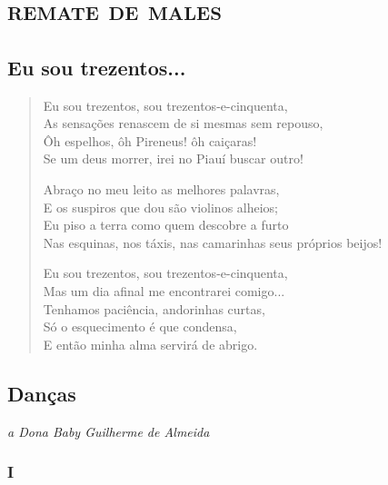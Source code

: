 \part{\textsc{remate de males}}
\removeepigraph


\chapter[Eu sou trezentos...]{Eu sou trezentos... }

\begin{verse}
Eu sou trezentos, sou trezentos-e-cinquenta,\\
As sensações renascem de si mesmas sem repouso,\\
Ôh espelhos, ôh Pireneus! ôh caiçaras!\\
Se um deus morrer, irei no Piauí buscar outro!

Abraço no meu leito as melhores palavras,\\
E os suspiros que dou são violinos alheios;\\
Eu piso a terra como quem descobre a furto\\
Nas esquinas, nos táxis, nas camarinhas seus próprios beijos!

Eu sou trezentos, sou trezentos-e-cinquenta,\\
Mas um dia afinal me encontrarei comigo...\\
Tenhamos paciência, andorinhas curtas,\\
Só o esquecimento é que condensa,\\
E então minha alma servirá de abrigo.
\end{verse}

\chapter[Danças]{Danças }


\begin{flushright}
\emph{a Dona Baby Guilherme de Almeida}
\end{flushright}

\section{I}

